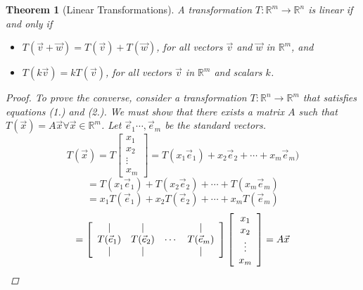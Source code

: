 \documentclass[10pt]{report}
\newtheorem{thm2}{Theorem}[section]
\begin{document}
\begin{thm2}[Linear Transformations]
A transformation $T:\mathbb{R}^m \to \mathbb{R}^n$ is linear if and only if
\begin{itemize}
\item[1.] $T(\vec{v} + \vec{w}) = T(\vec{v}) + T(\vec{w})$, for all vectors $\vec{v}$ and $\vec{w}$ in $\mathbb{R}^m$, and
\item[2.] $T(k\vec{v}) = kT(\vec{v})$, for all vectors $\vec{v}$ in $\mathbb{R}^m$ and scalars $k$.
\end{itemize}
\begin{proof}
To prove the converse, consider a transformation $T:\mathbb{R}^n \to \mathbb{R}^m$ that satisfies equations (1.) and (2.). We must show that there exists a matrix $A$ such that $T(\vec{x}) = A\vec{x}\forall \vec{x}\in \mathbb{R}^m$. Let $\vec{e}_1\cdots , \vec{e}_m$ be the standard vectors.
$$T(\vec{x}) = T\left[ \begin{array}{c}
x_1\\
x_2\\
\vdots \\
x_m
\end{array}\right] = T(x_1 \vec{e}_1) + x_2 \vec{e}_2 + \cdots + x_m \vec{e}_m)$$
$$=T(x_1 \vec{e}_1) + T(x_2 \vec{e}_2) + \cdots + T(x_m \vec{e}_m)$$
$$=x_1T(\vec{e}_1) + x_2T (\vec{e}_2) + \cdots + x_m T(\vec{e}_m)$$
$$=\left[ \begin{array}{c c c c}
| & | & & |\\
T(\vec{e}_1) & T(\vec{e}_2) & \cdots & T(\vec{e}_m)\\
| & | & & |
\end{array}\right]\left[ \begin{array}{c}
x_1\\
x_2\\
\vdots \\
x_m
\end{array}\right] = A \vec{x}$$
\end{proof}
\end{thm2}
\end{document}

